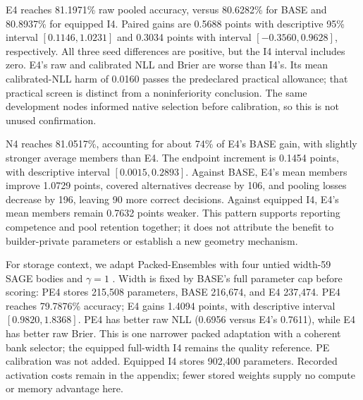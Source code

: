 E4 reaches 81.1971\% raw pooled accuracy, versus 80.6282\% for BASE and 80.8937\% for equipped I4. Paired gains are 0.5688 points with descriptive 95\% interval $[0.1146,1.0231]$ and 0.3034 points with interval $[-0.3560,0.9628]$, respectively. All three seed differences are positive, but the I4 interval includes zero. E4's raw and calibrated NLL and Brier are worse than I4's. Its mean calibrated-NLL harm of 0.0160 passes the predeclared practical allowance; that practical screen is distinct from a noninferiority conclusion. The same development nodes informed native selection before calibration, so this is not unused confirmation.

N4 reaches 81.0517\%, accounting for about 74\% of E4's BASE gain, with slightly stronger average members than E4. The endpoint increment is 0.1454 points, with descriptive interval $[0.0015,0.2893]$. Against BASE, E4's mean members improve 1.0729 points, covered alternatives decrease by 106, and pooling losses decrease by 196, leaving 90 more correct decisions. Against equipped I4, E4's mean members remain 0.7632 points weaker. This pattern supports reporting competence and pool retention together; it does not attribute the benefit to builder-private parameters or establish a new geometry mechanism.

For storage context, we adapt Packed-Ensembles with four untied width-59 SAGE bodies and $\gamma=1$ \citep{laurent2023packed}. Width is fixed by BASE's full parameter cap before scoring: PE4 stores 215,508 parameters, BASE 216,674, and E4 237,474. PE4 reaches 79.7876\% accuracy; E4 gains 1.4094 points, with descriptive interval $[0.9820,1.8368]$. PE4 has better raw NLL (0.6956 versus E4's 0.7611), while E4 has better raw Brier. This is one narrower packed adaptation with a coherent bank selector; the equipped full-width I4 remains the quality reference. PE calibration was not added. Equipped I4 stores 902,400 parameters. Recorded activation costs remain in the appendix; fewer stored weights supply no compute or memory advantage here.
